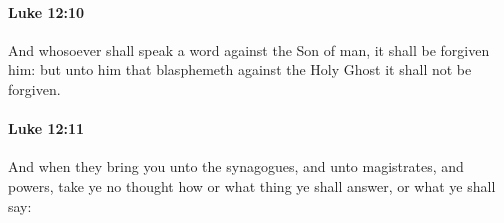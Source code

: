 		\paragraph{Luke 12:10} %
			\label{LUKE-12-10}

			And whosoever shall speak a word against the Son of man, it shall be forgiven him: but unto him that blasphemeth against the Holy Ghost it shall not be forgiven.

			\begin{framed}
			\scriptsize
				\begin{compactdesc}
					\item[SBLG] 
				\end{compactdesc}
			\end{framed}

		\paragraph{Luke 12:11} %
			\label{LUKE-12-11}

			And when they bring you unto the synagogues, and unto magistrates, and powers, take ye no thought how or what thing ye shall answer, or what ye shall say:

